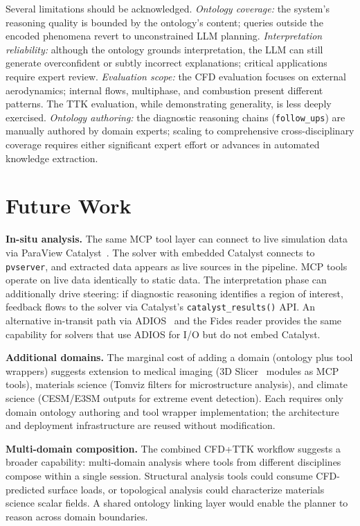 \documentclass{vgtc}                          %
\begin{document}
Several limitations should be acknowledged.
\textit{Ontology coverage:} the system's reasoning quality is bounded by the
ontology's content; queries outside the encoded phenomena revert to
unconstrained LLM planning.
\textit{Interpretation reliability:} although the ontology grounds
interpretation, the LLM can still generate overconfident or subtly incorrect
explanations; critical applications require expert review.
\textit{Evaluation scope:} the CFD evaluation focuses on external aerodynamics;
internal flows, multiphase, and combustion present different patterns.
The TTK evaluation, while demonstrating generality, is less deeply exercised.
\textit{Ontology authoring:} the diagnostic reasoning chains
(\texttt{follow\_ups}) are manually authored by domain experts;
scaling to comprehensive cross-disciplinary coverage requires either significant
expert effort or advances in automated knowledge extraction.


\section{Future Work}

\textbf{In-situ analysis.}
The same MCP tool layer can connect to live simulation data via ParaView
Catalyst~\cite{Ayachit:2015:Catalyst}.
The solver with embedded Catalyst connects to \texttt{pvserver}, and extracted
data appears as live sources in the pipeline.
MCP tools operate on live data identically to static data.
The interpretation phase can additionally drive steering: if diagnostic
reasoning identifies a region of interest, feedback flows to the solver via
Catalyst's \texttt{catalyst\_results()} API.
An alternative in-transit path via ADIOS~\cite{Godoy:2020:ADIOS} and the Fides
reader provides the same capability for solvers that use ADIOS for I/O but do
not embed Catalyst.


\textbf{Additional domains.}
The marginal cost of adding a domain (ontology plus tool wrappers) suggests
extension to medical imaging (3D Slicer~\cite{Fedorov:2012:3DS} modules as MCP
tools), materials science (Tomviz filters for microstructure analysis), and
climate science (CESM/E3SM outputs for extreme event detection).
Each requires only domain ontology authoring and tool wrapper implementation;
the architecture and deployment infrastructure are reused without modification.

\textbf{Multi-domain composition.}
The combined CFD+TTK workflow suggests a broader capability: multi-domain
analysis where tools from different disciplines compose within a single session.
Structural analysis tools could consume CFD-predicted surface loads, or
topological analysis could characterize materials science scalar fields.
A shared ontology linking layer would enable the planner to reason across domain
boundaries.
\end{document}
